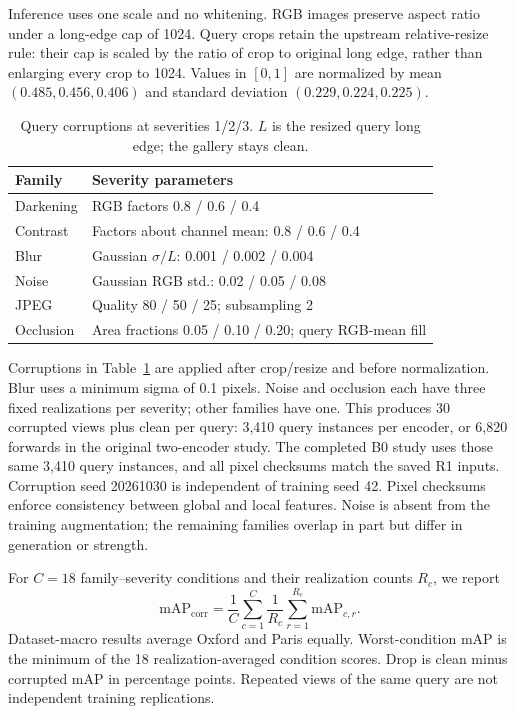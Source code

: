 Inference uses one scale and no whitening. RGB images preserve aspect ratio under a long-edge cap of 1024. Query crops retain the upstream relative-resize rule: their cap is scaled by the ratio of crop to original long edge, rather than enlarging every crop to 1024. Values in $[0,1]$ are normalized by mean $(0.485,0.456,0.406)$ and standard deviation $(0.229,0.224,0.225)$.

\begin{table}[t]
\caption{Query corruptions at severities 1/2/3. $L$ is the resized query long edge; the gallery stays clean.}
\label{tab:corrupt}
\centering\footnotesize
\begin{tabular}{lp{}}
\toprule
Family & Severity parameters \\
\midrule
Darkening & RGB factors 0.8 / 0.6 / 0.4 \\
Contrast & Factors about channel mean: 0.8 / 0.6 / 0.4 \\
Blur & Gaussian $\sigma/L$: 0.001 / 0.002 / 0.004 \\
Noise & Gaussian RGB std.: 0.02 / 0.05 / 0.08 \\
JPEG & Quality 80 / 50 / 25; subsampling 2 \\
Occlusion & Area fractions 0.05 / 0.10 / 0.20; query RGB-mean fill \\
\bottomrule
\end{tabular}
\end{table}

Corruptions in Table~\ref{tab:corrupt} are applied after crop/resize and before normalization. Blur uses a minimum sigma of 0.1 pixels. Noise and occlusion each have three fixed realizations per severity; other families have one. This produces 30 corrupted views plus clean per query: 3,410 query instances per encoder, or 6,820 forwards in the original two-encoder study. The completed B0 study uses those same 3,410 query instances, and all pixel checksums match the saved R1 inputs. Corruption seed 20261030 is independent of training seed 42. Pixel checksums enforce consistency between global and local features. Noise is absent from the training augmentation; the remaining families overlap in part but differ in generation or strength.

For $C=18$ family--severity conditions and their realization counts $R_c$, we report
\begin{equation}
 \mathrm{mAP}_{\mathrm{corr}}=\frac1C\sum_{c=1}^{C}
 \frac{1}{R_c}\sum_{r=1}^{R_c}\mathrm{mAP}_{c,r}.
\end{equation}
Dataset-macro results average Oxford and Paris equally. Worst-condition mAP is the minimum of the 18 realization-averaged condition scores. Drop is clean minus corrupted mAP in percentage points. Repeated views of the same query are not independent training replications.


